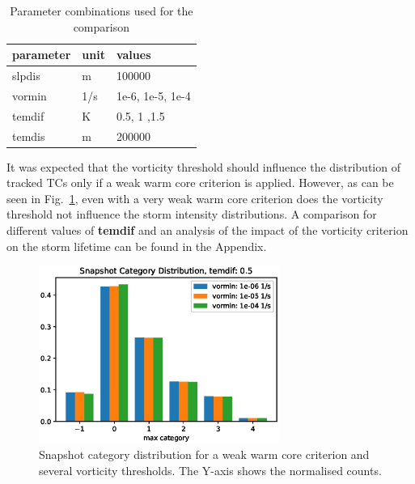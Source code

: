 \begin{table}[ht]
	\centering
	\begin{tabular}{|l|l|l|}
		\hline
		\textbf{parameter} & \textbf{unit} & \textbf{values}  \\ \hline
		slpdis             & m             & 100000           \\
		vormin             & 1/s           & 1e-6, 1e-5, 1e-4 \\
		temdif             & K             & 0.5, 1 ,1.5      \\
		temdis             & m             & 200000           \\ \hline
	\end{tabular}
	\caption{Parameter combinations used for the comparison}
	\label{tab:vor-tem-comparison}
\end{table}
It was expected that the vorticity threshold should influence the distribution of tracked TCs only if a weak warm core criterion is applied. However, as can be seen in Fig.~\ref{fig:temdif-vormin-comp}, even with a very weak warm core criterion does the vorticity threshold not influence the storm intensity distributions. A comparison for different values of \textbf{temdif} and an analysis of the impact of the vorticity criterion on the storm lifetime can be found in the Appendix.

\begin{figure}[ht]
	\centering
	\includegraphics[width=0.7\textwidth]{img/curr_category_vortem05.eps}
	\caption{Snapshot category distribution for a weak warm core criterion and several vorticity thresholds. The Y-axis shows the normalised counts.}
	\label{fig:temdif-vormin-comp}
\end{figure}

